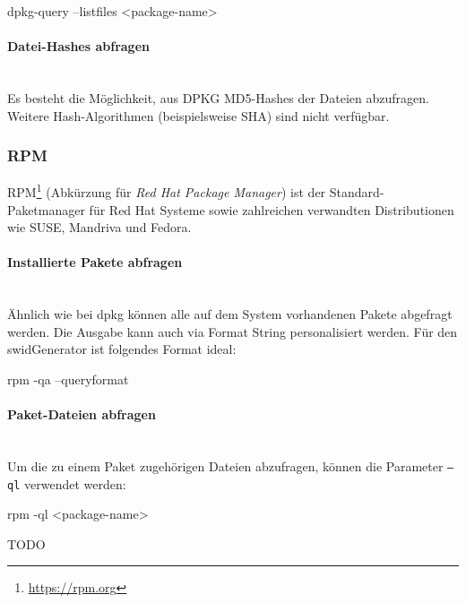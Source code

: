 \begin{bashcode}
dpkg-query --listfiles <package-name>
\end{bashcode}

\paragraph{Datei-Hashes abfragen} \hspace{0pt} \\

\noindent Es besteht die Möglichkeit, aus DPKG MD5-Hashes der Dateien abzufragen. Weitere
Hash-Algorithmen (beispielsweise SHA) sind nicht verfügbar.


\subsubsection{RPM}

RPM\footnote{\url{https://rpm.org}} (Abkürzung für
\textit{Red Hat Package Manager}) ist der Standard-Paketmanager für Red Hat Systeme sowie zahlreichen verwandten Distributionen wie SUSE, Mandriva und Fedora.

\paragraph{Installierte Pakete abfragen} \hspace{0pt} \\

\noindent Ähnlich wie bei dpkg können alle auf dem System vorhandenen Pakete abgefragt werden. Die Ausgabe kann auch via Format String personalisiert werden. Für den swidGenerator ist folgendes Format ideal:

\begin{bashcode}
rpm -qa --queryformat %
\end{bashcode}

\paragraph{Paket-Dateien abfragen} \hspace{0pt} \\

\noindent Um die zu einem Paket zugehörigen Dateien abzufragen, können die Parameter \texttt{--ql} verwendet werden:

\begin{bashcode}
rpm -ql <package-name>
\end{bashcode}

\noindent TODO
